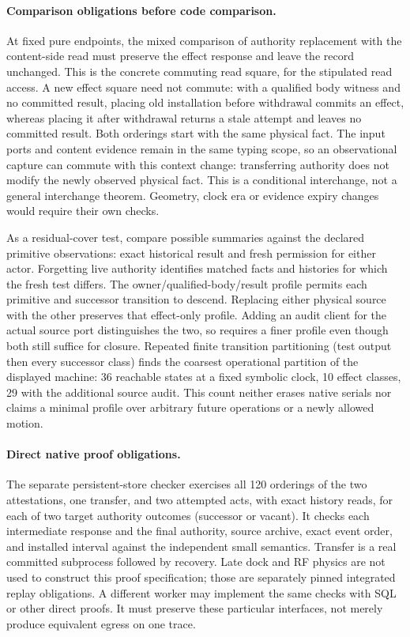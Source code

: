 \documentclass{article}
\begin{document}
\paragraph{Comparison obligations before code comparison.}
At fixed pure endpoints, the mixed comparison of authority
replacement with the content-side read must preserve the effect
response and leave the record unchanged. This is the concrete
commuting read square, for the stipulated read access. A new
effect square need not commute: with a qualified body witness and
no committed result, placing old installation before withdrawal
commits an effect, whereas placing it after withdrawal returns a
stale attempt and leaves no committed result. Both orderings start
with the same physical fact. The input ports and content evidence
remain in the same typing scope, so an observational capture can
commute with this context change: transferring authority does not
modify the newly observed physical fact. This is a conditional
interchange, not a general interchange theorem. Geometry, clock
era or evidence expiry changes would require their own checks.

As a residual-cover test, compare possible summaries against
the declared primitive observations: exact historical result and
fresh permission for either actor. Forgetting live authority
identifies matched facts and histories for which the fresh test
differs. The owner/qualified-body/result profile permits each
primitive and successor transition to descend. Replacing either
physical source with the other preserves that effect-only
profile. Adding an audit client for the actual source port
distinguishes the two, so requires a finer profile even though
both still suffice for closure. Repeated finite transition
partitioning (test output then every successor class) finds
the coarsest operational partition of the displayed machine:
36 reachable states at a fixed symbolic clock, 10 effect
classes, 29 with the additional source audit. This count neither
erases native serials nor claims a minimal profile over arbitrary
future operations or a newly allowed motion.

\paragraph{Direct native proof obligations.}
The separate persistent-store checker exercises all 120 orderings
of the two attestations, one transfer, and two attempted acts,
with exact history reads, for each of two target authority outcomes
(successor or vacant). It checks each intermediate response and
the final authority, source archive, exact event order, and
installed interval against the independent small semantics.
Transfer is a real committed subprocess followed by recovery.
Late dock and RF physics are not used to construct this proof
specification; those are separately pinned integrated replay
obligations. A different worker may implement the same checks with
SQL or other direct proofs. It must preserve these particular
interfaces, not merely produce equivalent egress on one trace.
\end{document}

